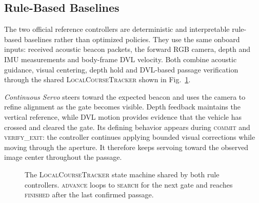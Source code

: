 \subsection{Rule-Based Baselines}

The two official reference controllers are deterministic and interpretable rule-based baselines rather than optimized policies. They use the same onboard inputs: received acoustic beacon packets, the forward RGB camera, depth and IMU measurements and body-frame DVL velocity. Both combine acoustic guidance, visual centering, depth hold and DVL-based passage verification through the shared \textsc{LocalCourseTracker} shown in Fig.~\ref{fig:rule_baseline_state}.

\emph{Continuous Servo} steers toward the expected beacon and uses the camera to refine alignment as the gate becomes visible. Depth feedback maintains the vertical reference, while DVL motion provides evidence that the vehicle has crossed and cleared the gate. Its defining behavior appears during \textsc{commit} and \textsc{verify\_exit}: the controller continues applying bounded visual corrections while moving through the aperture. It therefore keeps servoing toward the observed image center throughout the passage.

\begin{figure}[t]
\centering
\scriptsize
{}
\caption{The \textsc{LocalCourseTracker} state machine shared by both rule controllers. \textsc{advance} loops to \textsc{search} for the next gate and reaches \textsc{finished} after the last confirmed passage.}
\label{fig:rule_baseline_state}
\end{figure}


